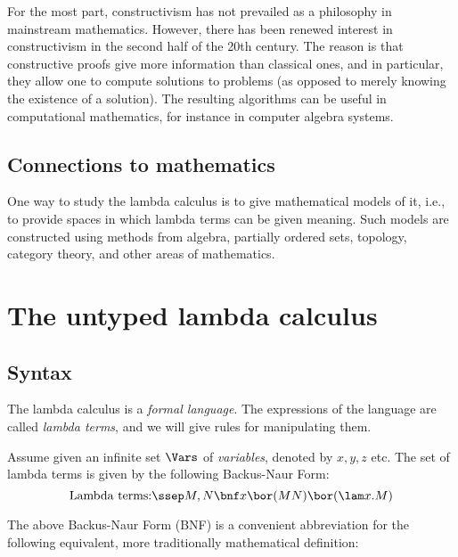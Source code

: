 \documentclass[12pt]{article}
\begin{document}
For the most part, constructivism has not prevailed as a philosophy in
mainstream mathematics. However, there has been renewed interest in
constructivism in the second half of the 20th century. The reason is
that constructive proofs give more information than classical ones,
and in particular, they allow one to compute solutions to problems (as
opposed to merely knowing the existence of a solution). The resulting
algorithms can be useful in computational mathematics, for instance in
computer algebra systems.

\subsection{Connections to mathematics}

One way to study the lambda calculus is to give mathematical models of
it, i.e., to provide spaces in which lambda terms can be given
meaning.  Such models are constructed using methods from algebra,
partially ordered sets, topology, category theory, and other areas of
mathematics.

\section{The untyped lambda calculus}

\subsection{Syntax}

The lambda calculus is a {\em formal language}. The expressions of the
language are called {\em lambda terms}, and we will give rules for
manipulating them.

\begin{definition}
  Assume given an infinite set $\Vars$ of {\em variables}, denoted by
  $x,y,z$ etc. The set of lambda terms is given by the following
  Backus-Naur Form:
  \[  \mbox{Lambda terms:}\ssep M,N \bnf x \bor (MN) \bor (\lam x.M)
  \]
\end{definition}

The above Backus-Naur Form (BNF) is a convenient abbreviation for the
following equivalent, more traditionally mathematical definition:
\end{document}
